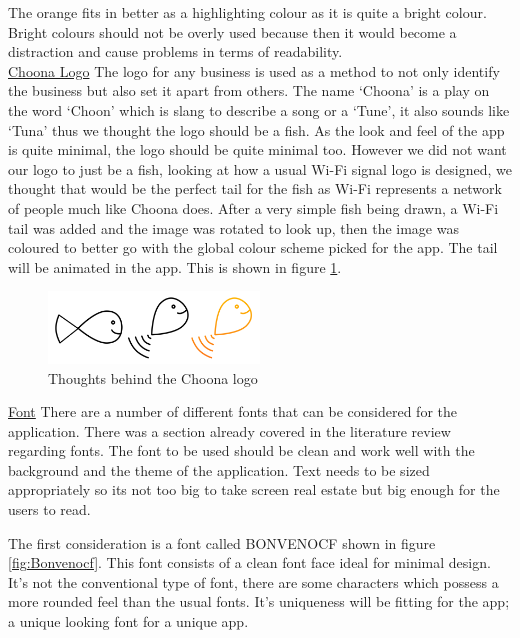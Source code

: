 The orange fits in better as a highlighting colour as it is quite a bright colour. Bright colours should not be overly used because then it would become a distraction and cause problems in terms of readability.  \\

\noindent\underline{Choona Logo}\newline
The logo for any business is used as a method to not only identify the business but also set it apart from others. The name `Choona' is a play on the word `Choon' which is slang to describe a song or a `Tune', it also sounds like `Tuna' thus we thought the logo should be a fish. As the look and feel of the app is quite minimal, the logo should be quite minimal too. However we did not want our logo to just be a fish, looking at how a usual Wi-Fi signal logo is designed, we thought that would be the perfect tail for the fish as Wi-Fi represents a network of people much like Choona does. After a very simple fish being drawn, a Wi-Fi tail was added and the image was rotated to look up, then the image was coloured to better go with the global colour scheme picked for the app. The tail will be animated in the app. This is shown in figure \ref{fig:logo}.

\begin{figure}[h!]
\centering
\includegraphics[width=0.5\textwidth]{./img/logothinking.png}
\caption{Thoughts behind the Choona logo}
\label{fig:logo}
\end{figure}


\noindent\underline{Font}\newline
There are a number of different fonts that can be considered for the application. There was a section already covered in the literature review regarding fonts. The font to be used should be clean and work well with the background and the theme of the application. Text needs to be sized appropriately so its not too big to take screen real estate but big enough for the users to read.

The first consideration is a font called BONVENOCF shown in figure \ref{fig:Bonvenocf}. This font consists of a clean font face ideal for minimal design. It's not the conventional type of font, there are some characters which possess a more rounded feel than the usual fonts. It's uniqueness will be fitting for the app; a unique looking font for a unique app. 

